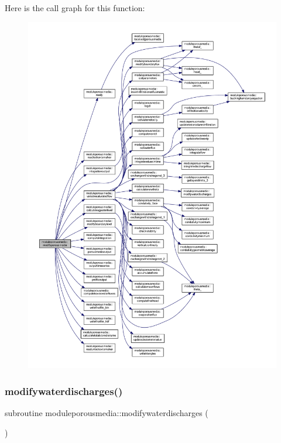 Here is the call graph for this function\+:\nopagebreak
\begin{figure}[H]
\begin{center}
\leavevmode
\includegraphics[width=350pt]{namespacemoduleporousmedia_a382cfd35fca1c040d9c4d2fb68011276_cgraph}
\end{center}
\end{figure}
\mbox{\label{namespacemoduleporousmedia_a1a0af39f7098b5de11c64c15cb6f4c39}} 
\subsubsection{\texorpdfstring{modifywaterdischarges()}{modifywaterdischarges()}}
{\footnotesize\ttfamily subroutine moduleporousmedia\+::modifywaterdischarges (\begin{DoxyParamCaption}{ }\end{DoxyParamCaption})\hspace{0.3cm}{\ttfamily [private]}}

